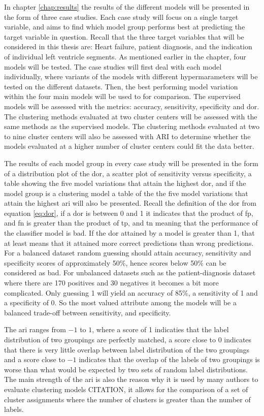 In chapter \ref{chap:results} the results of the different models will be presented in the form of three case studies. Each case study will focus on a single target variable, and aims to find which model group performs best at predicting the target variable in question. Recall that the three target variables that will be considered in this thesis are: Heart failure, patient diagnosis, and the indication of individual left ventricle segments. As mentioned earlier in the chapter, four models will be tested. The case studies will first deal with each model individually, where variants of the models with different hypermarameters will be tested on the different datasets. Then, the best performing model variation within the four main models will be used to for comparison. The supervised models will be assessed with the metrics: accuracy, sensitivity, specificity and \acrshort{dor}. The clustering methods evaluated at two cluster centers will be assessed with the same methods as the supervised models. The clustering methods evaluated at two to nine cluster centers will also be assessed with ARI to determine whether the models evaluated at a higher number of cluster centers could fit the data better. \bigskip

The results of each model group in every case study will be presented in the form of a distribution plot of the \acrshort{dor}, a scatter plot of sensitivity versus specificity, a table showing the five model variations that attain the highest \acrshort{dor}, and if the model group is a clustering model a table of the the five model variations that attain the highest \acrshort{ari} will also be presented. Recall the definition of the \acrshort{dor} from equation \eqref{eq:dor}, if a \acrshort{dor} is between 0 and 1 it indicates that the product of \acrshort{fp}, and \acrshort{fn} is greater than the product of \acrshort{tp}, and \acrshort{tn} meaning that the performance of the classifier model is bad. If the \acrshort{dor} attained by a model is greater than 1, that at least means that it attained more correct predictions than wrong predictions. For a balanced dataset random guessing should attain accuracy, sensitivity and specificity scores of approximately 50$\%$, hence scores below 50$\%$ can be considered as bad. For unbalanced datasets such as the patient-diagnosis dataset where there are 170 positives and 30 negatives it becomes a bit more complicated. Only guessing 1 will yield an accuracy of 85$\%$, a sensitivity of 1 and a specificity of 0. So the most valued attribute among the models will be a balanced trade-off between sensitivity, and specificity. \bigskip

The \acrshort{ari} ranges from $-1$ to $1$, where a score of 1 indicaties that the label distribution of two groupings are perfectly matched, a score close to 0 indicates that there is very little overlap between label distribution of the two groupings and a score close to $-1$ indicates that the overlap of the labels of two groupings is worse than what would be expected by two sets of random label distributions. The main strength of the \acrshort{ari} is also the reason why it is used by many authors to evaluate clustering models CITATION, it allows for the comparison of a set of cluster assignments where the number of clusters is greater than the number of labels.